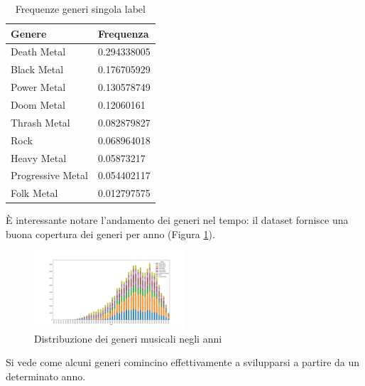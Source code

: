 \documentclass[technote]{IEEEtran}
\begin{document}
\begin{table}[H]
\centering
\caption{Frequenze generi singola label}
\begin{tabular}{|l|l|}
\hline
\textbf{Genere}   & \textbf{Frequenza} \\ \hline
Death Metal       & 0.294338005        \\ \hline
Black Metal       & 0.176705929        \\ \hline
Power Metal       & 0.130578749        \\ \hline
Doom Metal        & 0.12060161         \\ \hline
Thrash Metal      & 0.082879827        \\ \hline
Rock              & 0.068964018        \\ \hline
Heavy Metal       & 0.05873217         \\ \hline
Progressive Metal & 0.054402117        \\ \hline
Folk Metal        & 0.012797575        \\ \hline
\end{tabular}
\label{t_single_genre}
\end{table}
\`E interessante notare l'andamento dei generi nel tempo: il dataset
fornisce una buona copertura dei generi per anno (Figura \ref{fig_genre_year}).


\begin{figure}[H]
\centerline{\includegraphics[width=0.5\textwidth]{images/genre_per_year_distribution}}
\caption{Distribuzione dei generi musicali negli anni}
\label{fig_genre_year}
\end{figure}
Si vede come alcuni generi comincino effettivamente a svilupparsi a partire da un determinato anno.
\end{document}
